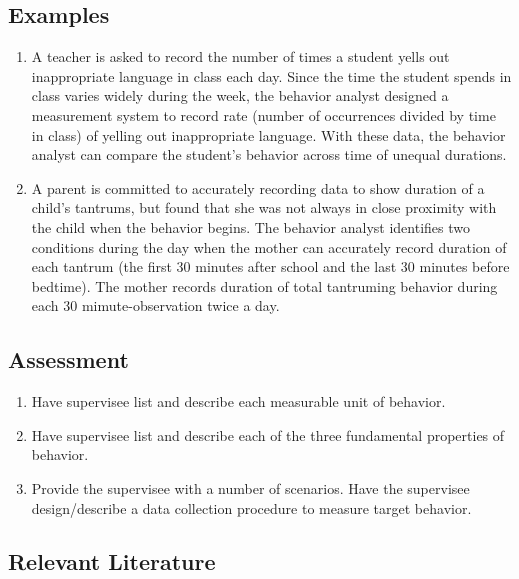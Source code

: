 \subsection{Examples}
\begin{enumerate}
\item A teacher is asked to record the number of times a student yells out inappropriate language in class each day. Since the time the student spends in class varies widely during the week, the behavior analyst designed a measurement system to record rate (number of occurrences divided by time in class) of yelling out inappropriate language. With these data, the behavior analyst can compare the student's behavior across time of unequal durations. 
\item A parent is committed to accurately recording data to show duration of a child's tantrums, but found that she was not always in close proximity with the child when the behavior begins. The behavior analyst identifies two conditions during the day when the mother can accurately record duration of each tantrum (the first 30 minutes after school and the last 30 minutes before bedtime). The mother records duration of total tantruming behavior during each 30 mimute-observation twice a day.
\end{enumerate}
%
\subsection{Assessment}
\begin{enumerate}
\item Have supervisee list and describe each measurable unit of behavior.
\item Have supervisee list and describe each of the three fundamental properties of behavior.
\item Provide the supervisee with a number of scenarios. Have the supervisee design/describe a data collection procedure to measure target behavior.
%
\end{enumerate}
%
\subsection{Relevant Literature}
\begin{refsection}
\nocite{test,alang2017police,clayton2018black}
\printbibliography[heading=none]
\end{refsection}
%
